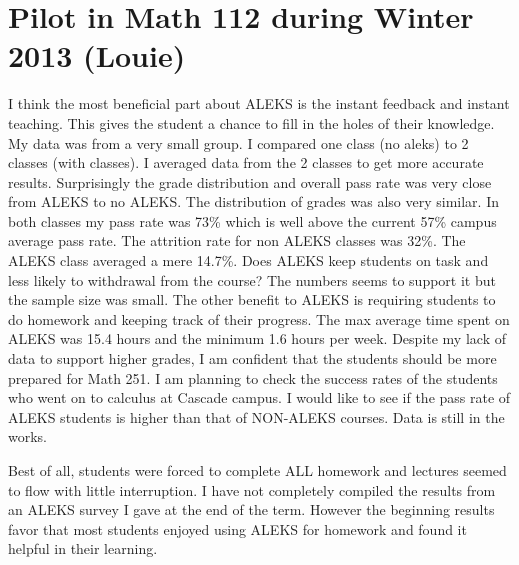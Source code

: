 \section{Pilot in Math 112 during Winter 2013 (Louie)}
I think the most beneficial part about ALEKS is the instant feedback and instant teaching. This gives the student a chance to fill in the holes of their knowledge. My data was from a very small group. I compared one class (no aleks) to 2 classes (with classes). I averaged data from the 2 classes to get more accurate results. Surprisingly the grade distribution and overall pass rate was very close from ALEKS to no ALEKS. The distribution of grades was also very similar. In both classes my pass rate was 73\% which is well above the current 57\% campus average pass rate. The attrition rate for non ALEKS classes was 32\%.  The ALEKS class averaged a mere 14.7\%. Does ALEKS keep students on task and less likely to
withdrawal from the course? The numbers seems to support it but the sample size was small. The other benefit to ALEKS is requiring students to do homework and keeping track of their progress. The max average time spent on ALEKS was 15.4 hours and the minimum 1.6 hours per week. Despite my lack of data to support higher grades, I am confident that the students should be more prepared for Math 251. I am planning to check the success rates of the students who went on to calculus at Cascade campus. I would like to see if the pass rate of ALEKS students is higher than that of NON-ALEKS courses. Data is still in the works.

Best of all, students were forced to complete ALL homework and lectures seemed to flow with little interruption. I have not completely compiled the results from an ALEKS survey I gave at the end of the term. However the beginning results favor that most students enjoyed using ALEKS for homework and found it helpful in their learning.
